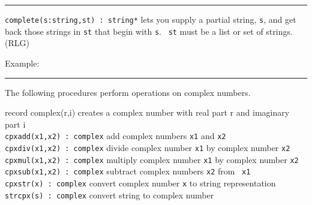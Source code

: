 \vspace{0.25cm}\hrule{}

\texttt{complete(s:string,st) : string*} lets you
supply a partial string, \texttt{s}, and get back those strings in
\texttt{st} that begin with \texttt{s}. \ \texttt{st} must be a list or
set of strings. (RLG)

Example:


\vspace{0.25cm}\hrule{}

The following procedures perform operations on complex numbers. 

\noindent \textsf{record complex(r,i)} creates a complex number with real part r
and imaginary part i\\
\texttt{cpxadd(x1,x2) : complex} add complex numbers \texttt{x1} and
\texttt{x2}\\
\texttt{cpxdiv(x1,x2) : complex} divide complex number \texttt{x1} by
complex number \texttt{x2}\\
\texttt{cpxmul(x1,x2) : complex} multiply complex number \texttt{x1} by
complex number \texttt{x2}\\
\texttt{cpxsub(x1,x2) : complex} subtract complex numbers \texttt{x2}
from \ \texttt{x1}\\
\texttt{cpxstr(x) : complex} convert complex number \texttt{x} to string
representation\\
\texttt{strcpx(s) : complex} convert string to complex number 

